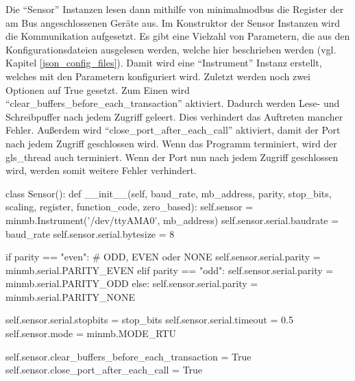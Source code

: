 Die \enquote{Sensor} Instanzen lesen dann mithilfe von minimalmodbus die Register der am Bus angeschlossenen Geräte aus. Im Konstruktor der Sensor Instanzen wird die Kommunikation aufgesetzt. Es gibt eine Vielzahl von Parametern, die aus den Konfigurationsdateien ausgelesen werden, welche hier beschrieben werden (vgl. Kapitel \ref{json_config_files}). Damit wird eine \enquote{Instrument} Instanz erstellt, welches mit den Parametern konfiguriert wird. Zuletzt werden noch zwei Optionen auf True gesetzt. Zum Einen wird \enquote{clear\_buffers\_before\_each\_transaction} aktiviert. Dadurch werden Lese- und Schreibpuffer nach jedem Zugriff geleert. Dies verhindert das Auftreten mancher Fehler. Außerdem wird \enquote{close\_port\_after\_each\_call} aktiviert, damit der Port nach jedem Zugriff geschlossen wird. Wenn das Programm terminiert, wird der \gls{gls_thread} auch terminiert. Wenn der Port nun nach jedem Zugriff geschlossen wird, werden somit weitere Fehler verhindert.

\begin{pythoncode}
class Sensor():
	def __init__(self, baud_rate, mb_address, parity, stop_bits, scaling, register, function_code, zero_based):
		self.sensor = minmb.Instrument('/dev/ttyAMA0', mb_address)
		self.sensor.serial.baudrate = baud_rate
		self.sensor.serial.bytesize = 8
		
		if parity == "even":  # ODD, EVEN oder NONE
			self.sensor.serial.parity = minmb.serial.PARITY_EVEN
		elif parity == "odd":
			self.sensor.serial.parity = minmb.serial.PARITY_ODD
		else:
			self.sensor.serial.parity = minmb.serial.PARITY_NONE
		
		self.sensor.serial.stopbits = stop_bits
		self.sensor.serial.timeout = 0.5
		self.sensor.mode = minmb.MODE_RTU
		
		self.sensor.clear_buffers_before_each_transaction = True
		self.sensor.close_port_after_each_call = True
\end{pythoncode}

